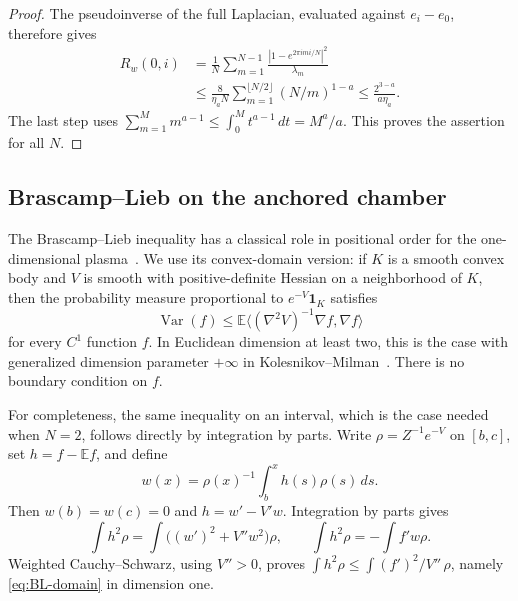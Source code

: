 \documentclass[11pt]{article}
\theoremstyle{remark}\newtheorem{remark}[theorem]{Remark}
\newcommand{\E}{\mathbb E}
\newcommand{\Var}{\operatorname{Var}}
\begin{document}
\begin{proof}
The pseudoinverse of the full Laplacian, evaluated against
$e_i-e_0$, therefore gives
\begin{align*}
 R_w(0,i)
  &=\frac1N\sum_{m=1}^{N-1}
           \frac{|1-e^{2\pi imi/N}|^2}{\lambda_m}\\
  &\le\frac8{\eta_aN}
          \sum_{m=1}^{\lfloor N/2\rfloor}(N/m)^{1-a}
   \le\frac{2^{3-a}}{a\eta_a}.
\end{align*}
The last step uses
$\sum_{m=1}^{M}m^{a-1}\le\int_0^M t^{a-1}\,dt=M^a/a$.
This proves the assertion for all $N$.
\end{proof}

\subsection{Brascamp--Lieb on the anchored chamber}

The Brascamp--Lieb inequality has a classical role in positional
order for the one-dimensional plasma~\cite{BL1975,BL}.  We use its
convex-domain version: if $K$ is a smooth convex body and $V$ is
smooth with positive-definite Hessian on a neighborhood of $K$,
then the probability measure proportional to $e^{-V}\mathbf1_K$
satisfies
\begin{equation}\label{eq:BL-domain}
 \Var(f)\le\E\bigl\langle(\nabla^2V)^{-1}\nabla f,\nabla f\bigr\rangle
\end{equation}
for every $C^1$ function $f$.  In Euclidean dimension at least two,
this is the case with generalized dimension parameter $+\infty$ in
Kolesnikov--Milman~\cite[Theorem~1.2(1), equivalently
Theorem~3.1(1)]{KM}.  There is no boundary condition on $f$.

For completeness, the same inequality on an interval, which is
the case needed when $N=2$, follows directly by integration by
parts.  Write $\rho=Z^{-1}e^{-V}$ on $[b,c]$, set
$h=f-\E f$, and define
\[
 w(x)=\rho(x)^{-1}\int_b^x h(s)\rho(s)\,ds.
\]
Then $w(b)=w(c)=0$ and $h=w'-V'w$.  Integration by parts gives
\[
 \int h^2\rho
   =\int\bigl((w')^2+V''w^2\bigr)\rho,
       \qquad
 \int h^2\rho=-\int f'w\rho.
\]
Weighted Cauchy--Schwarz, using $V''>0$, proves
$\int h^2\rho\le\int(f')^2/V''\,\rho$, namely
\eqref{eq:BL-domain} in dimension one.
\end{document}
